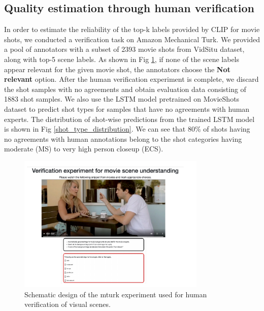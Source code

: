 \subsection{Quality estimation through human verification}
In order to estimate the reliability of the top-k labels provided by CLIP for movie shots, we conducted a verification task on Amazon Mechanical Turk. We provided a pool of annotators with a subset of 2393 movie shots from VidSitu \cite{Sadhu_2021_CVPR} dataset, along with top-5 scene labels. As shown in Fig \ref{mturk experiment},  if none of the scene labels appear relevant for the given movie shot, the annotators choose the \textbf{Not relevant} option.  After the human verification experiment is complete, we discard the shot samples with no agreements and obtain evaluation data consisting of 1883 shot samples. We also use the LSTM model pretrained on MovieShots dataset to predict shot types for samples that have no agreements with human experts. The distribution of shot-wise predictions from the trained LSTM model is shown in Fig \ref{shot_type_distribution}. We can see that 80\% of shots having no agreements with human annotations belong to the shot categories having moderate (MS) to very high person closeup (ECS). 
\begin{figure}[h!]
    \centering
    \includegraphics[width=0.8\textwidth]{figures/verification_experiment.pdf}
    \caption{Schematic design of the mturk experiment used for human verification of visual scenes.}
    \label{mturk experiment}
\end{figure}
